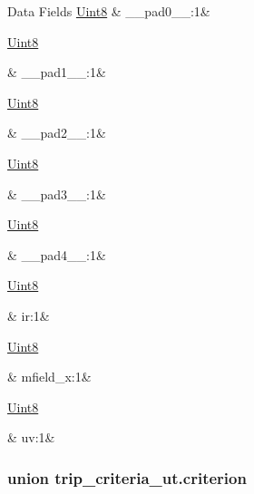 \begin{DoxyFields}{Data Fields}
\hypertarget{a00022_a74a47a7eac047138ff811ede153943e6}{\hyperlink{a00072_af84840501dec18061d18a68c162a8fa2}{Uint8}}\label{a00022_a74a47a7eac047138ff811ede153943e6}
&
\+\_\+\+\_\+pad0\+\_\+\+\_\+\+:1&
\\
\hline

\hypertarget{a00022_abb67792e94e88254ca5afecf7c26c912}{\hyperlink{a00072_af84840501dec18061d18a68c162a8fa2}{Uint8}}\label{a00022_abb67792e94e88254ca5afecf7c26c912}
&
\+\_\+\+\_\+pad1\+\_\+\+\_\+\+:1&
\\
\hline

\hypertarget{a00022_a2780c6c77e1f937563d98e2f517c2aeb}{\hyperlink{a00072_af84840501dec18061d18a68c162a8fa2}{Uint8}}\label{a00022_a2780c6c77e1f937563d98e2f517c2aeb}
&
\+\_\+\+\_\+pad2\+\_\+\+\_\+\+:1&
\\
\hline

\hypertarget{a00022_ad30f3f7ff6b12f7b97db2c89403b4238}{\hyperlink{a00072_af84840501dec18061d18a68c162a8fa2}{Uint8}}\label{a00022_ad30f3f7ff6b12f7b97db2c89403b4238}
&
\+\_\+\+\_\+pad3\+\_\+\+\_\+\+:1&
\\
\hline

\hypertarget{a00022_a72d43dbd74859e7e4034c3a0b841b13b}{\hyperlink{a00072_af84840501dec18061d18a68c162a8fa2}{Uint8}}\label{a00022_a72d43dbd74859e7e4034c3a0b841b13b}
&
\+\_\+\+\_\+pad4\+\_\+\+\_\+\+:1&
\\
\hline

\hypertarget{a00022_ad74eea4899a61f9fcbc527ef988ea0ff}{\hyperlink{a00072_af84840501dec18061d18a68c162a8fa2}{Uint8}}\label{a00022_ad74eea4899a61f9fcbc527ef988ea0ff}
&
ir\+:1&
\\
\hline

\hypertarget{a00022_a46709d870ad5c3126599a53675c43291}{\hyperlink{a00072_af84840501dec18061d18a68c162a8fa2}{Uint8}}\label{a00022_a46709d870ad5c3126599a53675c43291}
&
mfield\+\_\+x\+:1&
\\
\hline

\hypertarget{a00022_a45210da832f9626829457a65e9e7c4d0}{\hyperlink{a00072_af84840501dec18061d18a68c162a8fa2}{Uint8}}\label{a00022_a45210da832f9626829457a65e9e7c4d0}
&
uv\+:1&
\\
\hline

\end{DoxyFields}
\label{d7/d5f/a00831}
\hypertarget{a00022_d7/d5f/a00831}{}
\subsubsection{union trip\+\_\+criteria\+\_\+ut.\+criterion}


